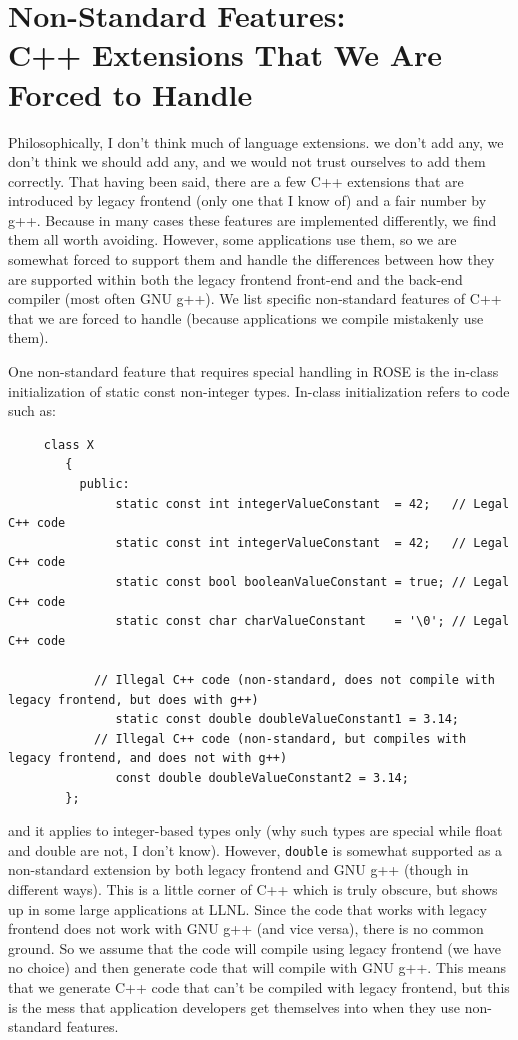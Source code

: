 \section{Non-Standard Features: \\ C++ Extensions That We Are Forced to Handle}

    Philosophically, I don't think much of language extensions. we don't add any, 
we don't think we should add any, and we would not trust ourselves to add them correctly.
That having been said, there are a few C++ extensions that are introduced by
legacy frontend (only one that I know of) and a fair number by g++.  Because in many cases these features 
are implemented differently, we find them all worth avoiding.  However,
some applications use them, so we are somewhat forced to support them and handle the 
differences between how they are supported within both the legacy frontend front-end and the
back-end compiler (most often GNU g++).  We list specific non-standard features of
C++ that we are forced to handle (because applications we compile mistakenly use them).

One non-standard feature that requires special handling in ROSE is the
in-class initialization of static const non-integer types. In-class initialization 
refers to code such as:
{\indent
{\mySmallFontSize
\begin{verbatim}
     class X
        {
          public:
               static const int integerValueConstant  = 42;   // Legal C++ code
               static const int integerValueConstant  = 42;   // Legal C++ code
               static const bool booleanValueConstant = true; // Legal C++ code
               static const char charValueConstant    = '\0'; // Legal C++ code

            // Illegal C++ code (non-standard, does not compile with legacy frontend, but does with g++)
               static const double doubleValueConstant1 = 3.14; 
            // Illegal C++ code (non-standard, but compiles with legacy frontend, and does not with g++)
               const double doubleValueConstant2 = 3.14; 
        };
\end{verbatim}
}}
           and it applies to integer-based types only (why such types are special while float
           and double are not, I don't know). However, {\tt double} is somewhat supported 
           as a non-standard extension by both legacy frontend and GNU g++ (though in different ways).
           This is a little corner of C++ which is truly obscure, but shows up in some
           large applications at LLNL.  Since the code that works with legacy frontend does not work
           with GNU g++ (and vice versa),
           there is no common ground.  So we assume that the code will compile using legacy frontend
           (we have no choice) and then generate code that will compile with GNU g++.
           This means that we generate C++ code that can't be compiled with legacy frontend, but this 
           is the mess that application developers get themselves into when they use
           non-standard features.


